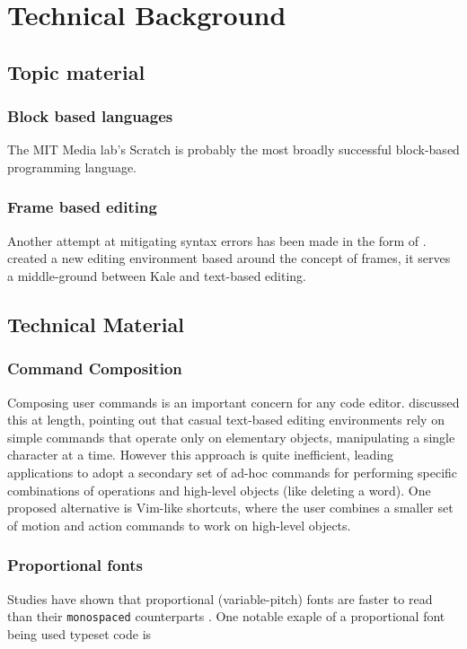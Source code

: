 \chapter{Technical Background}

\section{Topic material}

\subsection{Block based languages}

The MIT Media lab's Scratch \citep{Maloney2010} is probably the most broadly
successful block-based programming language.


\subsection{Frame based editing}

Another attempt at mitigating syntax errors has been made in the form of
.  \citet{Kolling2017} created a new
editing environment based around the concept of frames, it serves a middle-ground
between Kale and text-based editing.

\section{Technical Material}

\subsection{Command Composition}
Composing user commands is an important concern for any code editor.
\citet{Chodarev2016} discussed this at length, pointing out that casual
text-based editing environments rely on simple commands that operate only on
elementary objects, manipulating a single character at a time. However this
approach is quite inefficient, leading applications to adopt a secondary set of
ad-hoc commands for performing specific combinations of operations and
high-level objects (like deleting a word). One proposed alternative is
Vim-like shortcuts, where the user combines a smaller set of motion and action
commands to work on high-level objects.

\subsection{Proportional fonts}
Studies have shown that
proportional (variable-pitch) fonts are
faster to read than their \texttt{monospaced} counterparts \citep{Campbell1981,
Beldie1983}. One notable exaple
of a proportional font being used typeset code is 

